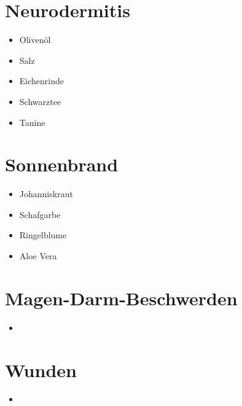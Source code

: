 \section{Neurodermitis}


\begin{itemize}
	\item Olivenöl
	\item Salz
	\item Eichenrinde
	\item Schwarztee
	\item Tanine
\end{itemize}




\section{Sonnenbrand}


\begin{itemize}
	\item Johanniskraut
	\item Schafgarbe
	\item Ringelblume
	\item Aloe Vera
\end{itemize}



\section{Magen-Darm-Beschwerden}


\begin{itemize}
	\item
\end{itemize}



\section{Wunden}


\begin{itemize}
	\item 
\end{itemize}